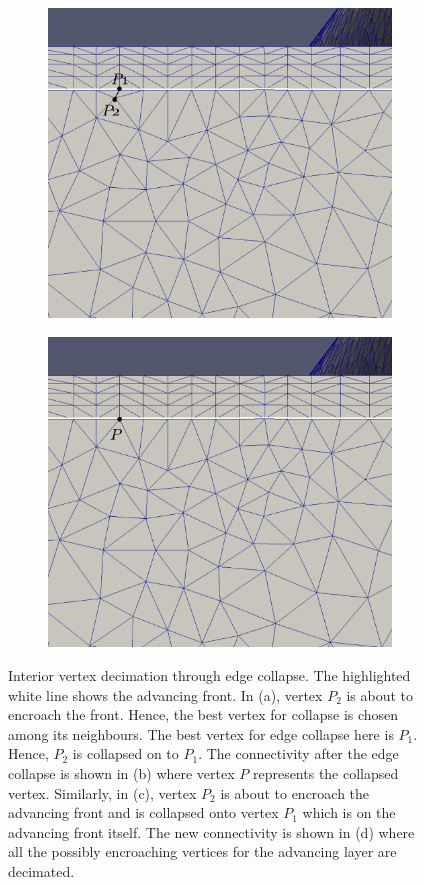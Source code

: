 \begin{figure}[hbt!]
\begin{subfigure}{.5\textwidth}
  \centering
  \includegraphics[width=.9\linewidth, trim={0 5cm 0  0}, clip]{img/m2/interior-vert-collapse/cc3.eps}
  \caption{}
  \label{cc3}
\end{subfigure}%
\begin{subfigure}{.5\textwidth}
  \centering
  \includegraphics[width=.9\linewidth, trim={0 5cm 0  0}, clip]{img/m2/interior-vert-collapse/cc4.eps}
  \caption{}
  \label{cc4}
\end{subfigure}
\caption{Interior vertex decimation through edge collapse. The highlighted white line shows the advancing front. In (a), vertex $P_2$ is about to encroach the front. Hence, the best vertex for collapse is chosen among its neighbours. The best vertex for edge collapse here is $P_1$. Hence, $P_2$ is collapsed on to $P_1$. The connectivity after the edge collapse is shown in (b) where vertex $P$ represents the collapsed vertex. Similarly, in (c), vertex $P_2$ is about to encroach the advancing front and is collapsed onto vertex $P_1$ which is on the advancing front itself. The new connectivity is shown in (d) where all the possibly encroaching vertices for the advancing layer are decimated.}
\label{interior-vert-collapse}
\end{figure}

